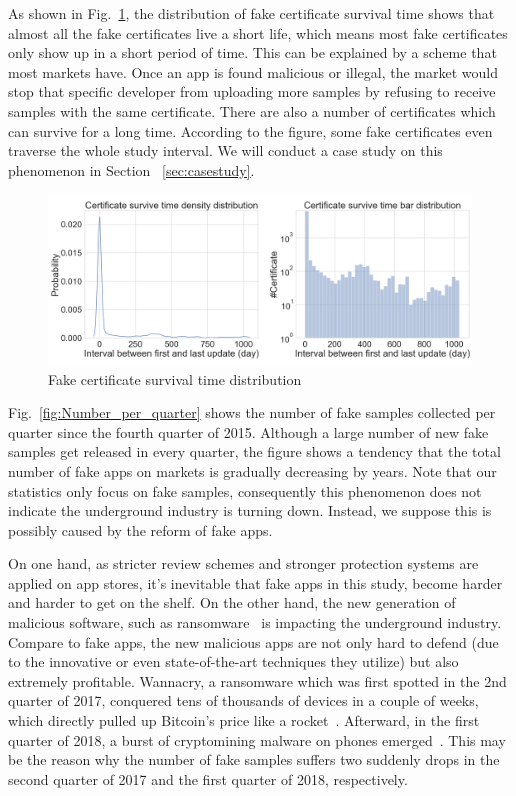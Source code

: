 As shown in Fig.~\ref{fig:Fake_certificate_survival_distribution}, the distribution of fake certificate survival time shows that almost all the fake certificates live a short life, which means most fake certificates only show up in a short period of time.
This can be explained by a scheme that most markets have.
Once an app is found malicious or illegal, the market would stop that specific developer from uploading more samples by refusing to receive samples with the same certificate.
There are also a number of certificates which can survive for a long time.
According to the figure, some fake certificates even traverse the whole study interval.
We will conduct a case study on this phenomenon in Section ~\ref{sec:casestudy}.

\begin{figure}
	\centering
	\includegraphics[width=\textwidth]{./Figures/edwin-Fake_certificate_survival_distribution2.png}
	\caption{Fake certificate survival time distribution}
	\label{fig:Fake_certificate_survival_distribution}
\end{figure}

 Fig.~\ref{fig:Number_per_quarter} shows the number of fake samples collected per quarter since the fourth quarter of 2015.
Although a large number of new fake samples get released in every quarter, the figure shows a tendency that the total number of fake apps on markets is gradually decreasing by years.
Note that our statistics only focus on fake samples, consequently this phenomenon does not indicate the underground industry is turning down.
Instead, we suppose this is possibly caused by the reform of fake apps.

On one hand, as stricter review schemes and stronger protection systems are applied on app stores, it's inevitable that fake apps in this study, become harder and harder to get on the shelf.
On the other hand, the new generation of malicious software, such as ransomware~\cite{ransomware} is impacting the underground industry.
Compare to fake apps, the new malicious apps are not only hard to defend (due to the innovative or even state-of-the-art techniques they utilize) but also extremely profitable.
Wannacry, a ransomware which was first spotted in the 2nd quarter of 2017, conquered tens of thousands of devices in a couple of weeks, which directly pulled up Bitcoin's price like a rocket~\cite{wannacry_bitcoin_news}.
Afterward, in the first quarter of 2018, a burst of cryptomining malware on phones emerged~\cite{comodo_report}.
This may be the reason why the number of fake samples suffers two suddenly drops in the second quarter of 2017 and the first quarter of 2018, respectively.


